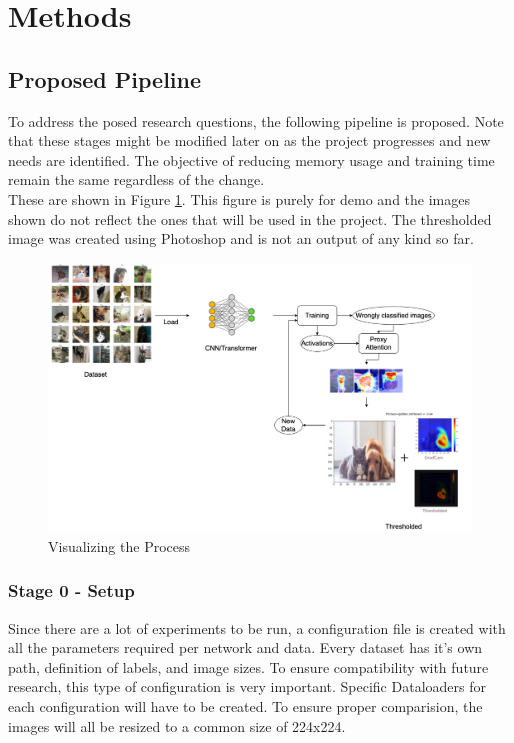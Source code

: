 \section{Methods} \label{section:methods}

\subsection{Proposed Pipeline}
To address the posed research questions, the following pipeline is proposed. Note that these stages might be modified later on as the project progresses and new needs are identified. The objective of reducing memory usage and training time remain the same regardless of the change.\\
These are shown in Figure \ref{fig:process}. This figure is purely for demo and the images shown do not reflect the ones that will be used in the project. The thresholded image was created using Photoshop and is not an output of any kind so far.

\begin{figure}[htbp]
    \centering
    \includegraphics[width=.9\textwidth]{images/thesis_report.drawio.png}
    \caption{Visualizing the Process}
    \label{fig:process}
\end{figure}

\subsubsection*{Stage 0 - Setup}
Since there are a lot of experiments to be run, a configuration file is created with all the parameters required per network and data. Every dataset has it's own path, definition of labels, and image sizes. To ensure compatibility with future research, this type of configuration is very important. Specific Dataloaders for each configuration will have to be created.
To ensure proper comparision, the images will all be resized to a common size of 224x224. 

